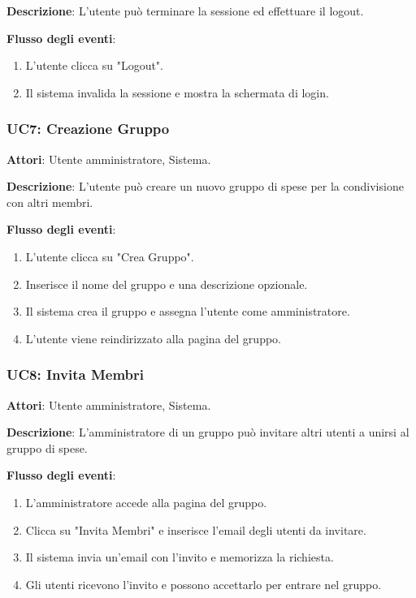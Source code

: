 \textbf{Descrizione}: L'utente può terminare la sessione ed effettuare il logout.

\textbf{Flusso degli eventi}:
\begin{enumerate}
    \item L'utente clicca su "Logout".
    \item Il sistema invalida la sessione e mostra la schermata di login.
\end{enumerate}

\subsubsection{UC7: Creazione Gruppo}
\textbf{Attori}: Utente amministratore, Sistema.

\textbf{Descrizione}: L’utente può creare un nuovo gruppo di spese per la condivisione con altri membri.

\textbf{Flusso degli eventi}:
\begin{enumerate}
    \item L’utente clicca su "Crea Gruppo".
    \item Inserisce il nome del gruppo e una descrizione opzionale.
    \item Il sistema crea il gruppo e assegna l’utente come amministratore.
    \item L'utente viene reindirizzato alla pagina del gruppo.
\end{enumerate}

\subsubsection{UC8: Invita Membri}
\textbf{Attori}: Utente amministratore, Sistema.

\textbf{Descrizione}: L’amministratore di un gruppo può invitare altri utenti a unirsi al gruppo di spese.

\textbf{Flusso degli eventi}:
\begin{enumerate}
    \item L’amministratore accede alla pagina del gruppo.
    \item Clicca su "Invita Membri" e inserisce l’email degli utenti da invitare.
    \item Il sistema invia un’email con l’invito e memorizza la richiesta.
    \item Gli utenti ricevono l’invito e possono accettarlo per entrare nel gruppo.
\end{enumerate}

